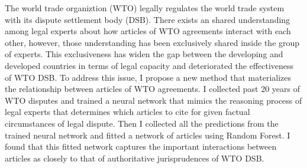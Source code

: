 The world trade organiztion (WTO) legally regulates the world trade system with its dispute settlement body (DSB).
There exists an shared understanding among legal experts about how articles of WTO agreements interact with each other, however, 
those understanding has been exclusively shared inside the group of experts.  %
This exclusiveness has widen the gap
between the developing and developed countries in terms of
legal capacity and deteriorated the effectiveness of WTO DSB.
To address this issue, I propose a new method that materializes the relationship between articles of WTO agreements. %
I collected past 20 years of WTO disputes and trained a neural network that mimics the reasoning process of legal experts that determines which articles to cite for given factual circumstances of legal dispute.
Then I collected all the predictions from the trained neural network and fitted a network of articles using Random Forest.
I found that this fitted network captures the important interactions between articles as closely to that of authoritative jurisprudences of WTO DSB.